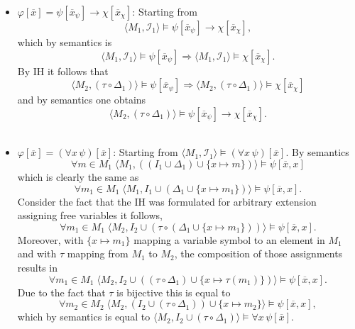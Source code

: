 \documentclass[11pt,a4paper]{article}
\newcommand{\sto}{\Rightarrow}
\begin{document}
\begin{itemize}[leftmargin=*]
\item $\varphi[\overline{x}] = \psi[\overline{x}_{\psi}] \to \chi[\overline{x}_{\chi}]$:
Starting from 
\begin{equation*}
\langle M_1, \mathcal{I}_1 \rangle \models \psi[\overline{x}_{\psi}] \to \chi[\overline{x}_{\chi}],
\end{equation*}
which by semantics is 
\begin{equation*}
\langle M_1, \mathcal{I}_1 \rangle \models \psi[\overline{x}_{\psi}] \sto \langle M_1, \mathcal{I}_1 \rangle \models \chi[\overline{x}_{\chi}].
\end{equation*}
By IH it follows that  
\begin{equation*}
\langle M_2, (\tau \circ \Delta_1) \rangle \models \psi[\overline{x}_{\psi}] \sto\langle M_2, (\tau \circ \Delta_1) \rangle \models \chi[\overline{x}_{\chi}]
\end{equation*}
and by semantics one obtains 
\begin{equation*}
\langle M_2, (\tau \circ \Delta_1) \rangle \models \psi[\overline{x}_{\psi}] \to \chi[\overline{x}_{\chi}].
\end{equation*}\\


\item  $\varphi[\overline{x}] = (\forall x \, \psi)[\overline{x}]$: Starting from $\langle M_1, \mathcal{I}_1 \rangle \models (\forall x \, \psi)[\overline{x}]$. By semantics  
\begin{equation*}
\forall m \in M_1 \; \langle M_1 , ((I_1 \cup \Delta_1) \cup \{x \mapsto m\}) \rangle \models \psi[\overline{x},x]
\end{equation*}
which is clearly the same as
\begin{equation*}
\forall m_1 \in M_1 \; \langle M_1 , I_1 \cup (\Delta_1 \cup \{x \mapsto m_1\}) \rangle \models \psi[\overline{x},x].
\end{equation*}
Consider the fact that the IH was formulated for arbitrary extension assigning free variables it follows,
 \begin{equation*}
\forall m_1 \in M_1 \;  \langle M_2 , I_2 \cup (\tau \circ (\Delta_1 \cup \{x \mapsto m_1\})) \rangle \models \psi[\overline{x},x].
\end{equation*} 
Moreover, with $\{x \mapsto m_1\}$ mapping a variable symbol to an element in $M_1$ and with $\tau$ mapping from $M_1$ to $M_2$, the composition of those assignments results in 
\begin{equation*}
\forall m_1 \in M_1 \;  \langle M_2 , I_2 \cup ((\tau \circ \Delta_1) \cup \{x \mapsto \tau (m_1)\}) \rangle \models \psi[\overline{x},x].
\end{equation*}
Due to the fact that $\tau$ is bijective this is equal to 
\begin{equation*}
\forall m_2 \in M_2 \;  \langle M_2 , (I_2 \cup (\tau \circ \Delta_1)) \cup \{x \mapsto m_2 \} \rangle \models \psi[\overline{x},x],
\end{equation*}
which by semantics is equal to $\langle M_2 , I_2 \cup (\tau \circ \Delta_1)\rangle \models \forall x \, \psi[\overline{x}]$. \\



\end{itemize}
\end{document}
